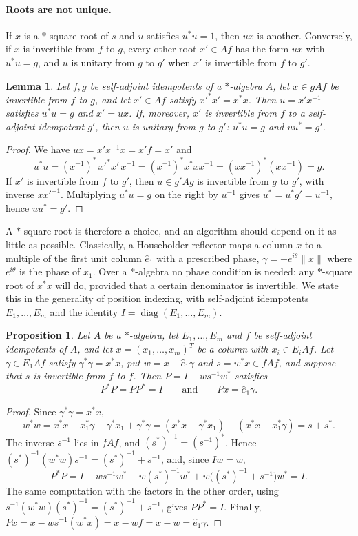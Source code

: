 \documentclass[12pt, a4paper]{report}
\theoremstyle{plain}
\newtheorem{lemma}[theorem]{Lemma}
\newtheorem{proposition}[theorem]{Proposition}
\theoremstyle{definition}
\theoremstyle{remark}
\theoremstyle{plain}
\DeclareMathOperator{\diag}{diag}
\begin{document}
\paragraph{Roots are not unique.} If $x$ is a $*$-square root of $s$ and $u$ satisfies $u^*u=1$, then $ux$ is another. Conversely, if $x$ is invertible from $f$ to $g$, every other root $x'\in Af$ has the form $ux$ with $u^*u=g$, and $u$ is unitary from $g$ to $g'$ when $x'$ is invertible from $f$ to $g'$.

\begin{lemma}\label{lem:sqrt-unique}
Let $f,g$ be self-adjoint idempotents of a $*$-algebra $A$, let $x\in gAf$ be invertible from $f$ to $g$, and let $x'\in Af$ satisfy $x'^*x'=x^*x$. Then $u=x'x^{-1}$ satisfies $u^*u=g$ and $x'=ux$. If, moreover, $x'$ is invertible from $f$ to a self-adjoint idempotent $g'$, then $u$ is unitary from $g$ to $g'$: $u^*u=g$ and $uu^*=g'$.
\end{lemma}
\begin{proof}
We have $ux=x'x^{-1}x=x'f=x'$ and
\[ u^*u=(x^{-1})^*\,x'^*x'\,x^{-1}=(x^{-1})^*x^*xx^{-1}=(xx^{-1})^*(xx^{-1})=g . \]
If $x'$ is invertible from $f$ to $g'$, then $u\in g'Ag$ is invertible from $g$ to $g'$, with inverse $xx'^{-1}$. Multiplying $u^*u=g$ on the right by $u^{-1}$ gives $u^*=u^*g'=u^{-1}$, hence $uu^*=g'$.
\end{proof}

A $*$-square root is therefore a choice, and an algorithm should depend on it as little as possible. Classically, a Householder reflector maps a column $x$ to a multiple of the first unit column $\hat e_1$ with a prescribed phase, $\gamma=-e^{i\theta}\|x\|$ where $e^{i\theta}$ is the phase of $x_1$. Over a $*$-algebra no phase condition is needed: any $*$-square root of $x^*x$ will do, provided that a certain denominator is invertible. We state this in the generality of position indexing, with self-adjoint idempotents $E_1,\dots,E_m$ and the identity $I=\diag(E_1,\dots,E_m)$.

\begin{proposition}\label{prop:householder-any-root}
Let $A$ be a $*$-algebra, let $E_1,\dots,E_m$ and $f$ be self-adjoint idempotents of $A$, and let $x=(x_1,\dots,x_m)^T$ be a column with $x_i\in E_iAf$. Let $\gamma\in E_1Af$ satisfy $\gamma^*\gamma=x^*x$, put $w=x-\hat e_1\gamma$ and $s=w^*x\in fAf$, and suppose that $s$ is invertible from $f$ to $f$. Then $P=I-ws^{-1}w^*$ satisfies
\[ P^*P=PP^*=I\qquad\text{and}\qquad Px=\hat e_1\gamma . \]
\end{proposition}
\begin{proof}
Since $\gamma^*\gamma=x^*x$,
\[ w^*w=x^*x-x_1^*\gamma-\gamma^*x_1+\gamma^*\gamma=(x^*x-\gamma^*x_1)+(x^*x-x_1^*\gamma)=s+s^*. \]
The inverse $s^{-1}$ lies in $fAf$, and $(s^*)^{-1}=(s^{-1})^*$. Hence $(s^*)^{-1}(w^*w)s^{-1}=(s^*)^{-1}+s^{-1}$, and, since $Iw=w$,
\[ P^*P=I-ws^{-1}w^*-w(s^*)^{-1}w^*+w\bigl((s^*)^{-1}+s^{-1}\bigr)w^*=I . \]
The same computation with the factors in the other order, using $s^{-1}(w^*w)(s^*)^{-1}=(s^*)^{-1}+s^{-1}$, gives $PP^*=I$. Finally, $Px=x-ws^{-1}(w^*x)=x-wf=x-w=\hat e_1\gamma$.
\end{proof}
\end{document}
